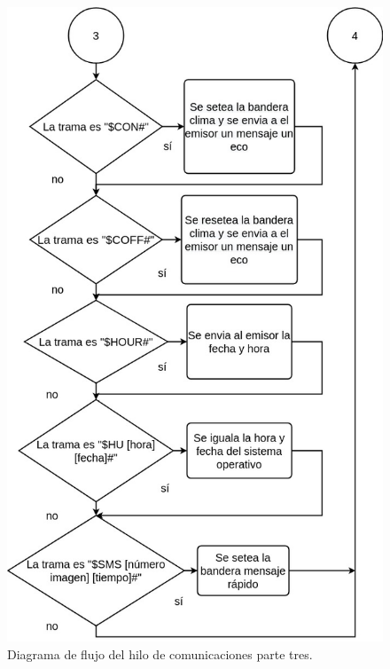 \begin{figure}[htpb]
	\centering
	\includegraphics[scale=0.6]{Figures/hilo2parte3.jpg} 
	\caption{Diagrama de flujo del hilo de comunicaciones parte tres.}
	\label{fig: hilocomparte3}
\end{figure}


